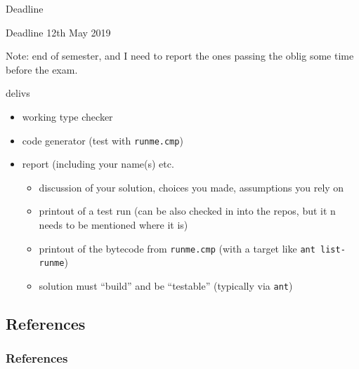 \documentclass{beamer}
\begin{document}
\begin{frame}[label={sec:org6bba1ee},fragile]{Deadline}
 \begin{alertblock}{Deadline}
12th May  2019
\end{alertblock}



Note: end of semester, and I need to report the ones passing the oblig some
time before the exam.


\begin{block}{delivs}
\begin{itemize}
\item working type checker
\item code generator (test with \texttt{runme.cmp})
\item report (including your name(s) etc.

\begin{itemize}
\item discussion of your solution, choices you made, assumptions you rely on

\item printout of a test run (can be also checked in into the repos, but it n
needs to be mentioned where it is)
\item printout of the bytecode from \texttt{runme.cmp} (with a target like \texttt{ant
    list-runme})

\item solution must ``build'' and be ``testable'' (typically via \texttt{ant})
\end{itemize}
\end{itemize}
\end{block}
\end{frame}



\subsection{References}
\label{sec:orgda6971a}

\begin{frame}[allowframebreaks]
  \frametitle{References}
  {\tiny
    
%     
  }
\end{frame}




\end{document}
